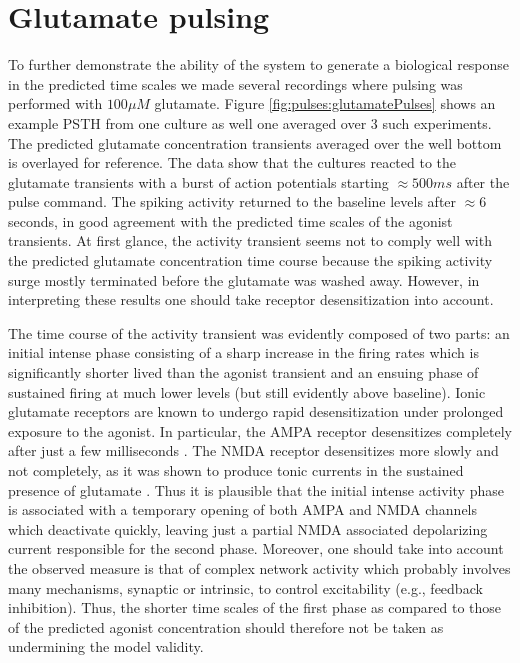 \section{Glutamate pulsing}
To further demonstrate the ability of the system to generate a biological response in the predicted time scales we made several recordings where pulsing was performed with \(100 \mu M\) glutamate. Figure \ref{fig:pulses:glutamatePulses} shows an example PSTH from one culture as well one averaged over 3 such experiments. The predicted glutamate concentration transients averaged over the well bottom is overlayed for reference. The data show that the cultures reacted to the glutamate transients with a burst of action potentials starting \(\approx 500 ms\) after the pulse command. The spiking activity returned to the baseline levels after \(\approx 6\) seconds, in good agreement with the predicted time scales of the agonist transients. At first glance, the activity transient seems not to comply well with the predicted glutamate concentration time course because the spiking activity surge mostly terminated before the glutamate was washed away. However, in interpreting these results one should take receptor desensitization into account. 

The time course of the activity transient was evidently composed of two parts: an initial intense phase consisting of a sharp increase in the firing rates which is significantly shorter lived than the agonist transient and an ensuing phase of sustained firing at much lower levels (but still evidently above baseline). Ionic glutamate receptors are known to undergo rapid desensitization under prolonged exposure to the agonist. In particular, the AMPA receptor desensitizes completely after just a few milliseconds \cite{trussell1993desensitization}. The NMDA receptor desensitizes more slowly \cite{mayer1985action} and not completely, as it was shown to produce tonic currents in the sustained presence of glutamate \cite{sah1989tonic}. Thus it is plausible that the initial intense activity phase is associated with a temporary opening of both AMPA and NMDA channels which deactivate quickly, leaving just a partial NMDA associated depolarizing current responsible for the second phase. Moreover, one should take into account the observed measure is that of complex network activity which probably involves many mechanisms, synaptic or intrinsic, to control excitability (e.g., feedback inhibition). Thus, the shorter time scales of the first phase as compared to those of the predicted agonist concentration should therefore not be taken as undermining the model validity.

